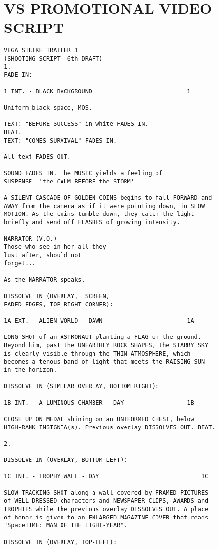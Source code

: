 \section{VS PROMOTIONAL VIDEO SCRIPT}
\begin{verbatim}
VEGA STRIKE TRAILER 1
(SHOOTING SCRIPT, 6th DRAFT)
1.
FADE IN:

1 INT. - BLACK BACKGROUND 							1

Uniform black space, MOS.

TEXT: "BEFORE SUCCESS" in white FADES IN.
BEAT.
TEXT: "COMES SURVIVAL" FADES IN.

All text FADES OUT.

SOUND FADES IN. The MUSIC yields a feeling of
SUSPENSE--'the CALM BEFORE the STORM'.

A SILENT CASCADE OF GOLDEN COINS begins to fall FORWARD and
AWAY from the camera as if it were pointing down, in SLOW
MOTION. As the coins tumble down, they catch the light
briefly and send off FLASHES of growing intensity.

NARRATOR (V.O.)
Those who see in her all they
lust after, should not
forget...

As the NARRATOR speaks,

DISSOLVE IN (OVERLAY,  SCREEN,
FADED EDGES, TOP-RIGHT CORNER):

1A EXT. - ALIEN WORLD - DAWN 						1A

LONG SHOT of an ASTRONAUT planting a FLAG on the ground.
Beyond him, past the UNEARTHLY ROCK SHAPES, the STARRY SKY
is clearly visible through the THIN ATMOSPHERE, which
becomes a tenous band of light that meets the RAISING SUN
in the horizon.

DISSOLVE IN (SIMILAR OVERLAY, BOTTOM RIGHT):

1B INT. - A LUMINOUS CHAMBER - DAY 					1B

CLOSE UP ON MEDAL shining on an UNIFORMED CHEST, below
HIGH-RANK INSIGNIA(s). Previous overlay DISSOLVES OUT. BEAT.

2.

DISSOLVE IN (OVERLAY, BOTTOM-LEFT):

1C INT. - TROPHY WALL - DAY 							1C

SLOW TRACKING SHOT along a wall covered by FRAMED PICTURES
of WELL-DRESSED characters and NEWSPAPER CLIPS, AWARDS and
TROPHIES while the previous overlay DISSOLVES OUT. A place
of honor is given to an ENLARGED MAGAZINE COVER that reads
"SpaceTIME: MAN OF THE LIGHT-YEAR".

DISSOLVE IN (OVERLAY, TOP-LEFT):


\end{verbatim}

